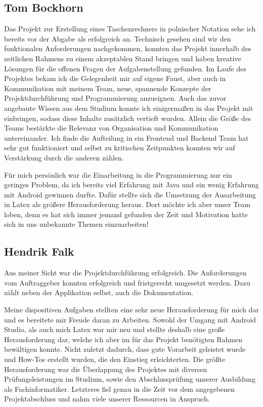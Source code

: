 \clearpage

\subsection{Tom Bockhorn}
Das Projekt zur Erstellung eines Taschenrechners in polnischer Notation sehe ich bereits vor der Abgabe als erfolgreich an. Technisch gesehen sind wir den funktionalen Anforderungen nachgekommen, konnten das Projekt innerhalb des zeitlichen Rahmens zu einem akzeptablen Stand bringen und haben kreative Lösungen für die offenen Fragen der Aufgabenstellung gefunden. Im Laufe des Projektes bekam ich die Gelegenheit mir auf eigene Faust, aber auch in Kommunikation mit meinem Team, neue, spannende Konzepte der Projektdurchführung und Programmierung anzueignen. Auch das zuvor angebaute Wissen aus dem Studium konnte ich einigermaßen in das Projekt mit einbringen, sodass diese Inhalte zusätzlich vertieft wurden. Allein die Größe des Teams bestärkte die Relevanz von Organisation und Kommunikation untereinander. Ich finde die Aufteilung in ein Frontend und Backend Team hat sehr gut funktioniert und selbst zu kritischen Zeitpunkten konnten wir auf Verstärkung durch die anderen zählen.

Für mich persönlich war die Einarbeitung in die Programmierung nur ein geringes Problem, da ich bereits viel Erfahrung mit Java und ein wenig Erfahrung mit Android gewinnen durfte. Dafür stellte sich die Umsetzung der Ausarbeitung in Latex als größere Herausforderung heraus. Dort möchte ich aber unser Team loben, denn es hat sich immer jemand gefunden der Zeit und Motivation hatte sich in uns unbekannte Themen einzuarbeiten!

\clearpage

\subsection{Hendrik Falk}
Aus meiner Sicht war die Projektdurchführung erfolgreich. Die Anforderungen vom Auftraggeber konnten erfolgreich und fristgerecht umgesetzt werden. Dazu zählt neben der Applikation selbst, auch die Dokumentation. 

Meine dispositiven Aufgaben stellten eine sehr neue Herausforderung für mich dar und es bereitete mir Freude daran zu Arbeiten. Sowohl der Umgang mit Android Studio, als auch mich Latex war mir neu und stellte deshalb eine große Herausforderung dar, welche ich aber im für das Projekt benötigten Rahmen bewältigen konnte. Nicht zuletzt dadurch, dass gute Vorarbeit geleistet wurde und How-Tos erstellt wurden, die den Einstieg erleichterten. Die größte Herausforderung war die Überlappung des Projektes mit diversen Prüfungsleistungen im Studium, sowie den Abschlussprüfung unserer Ausbildung als Fachinformatiker. Letzteres fiel genau in die Zeit vor dem angegebenen Projektabschluss und nahm viele unserer Ressourcen in Anspruch.

